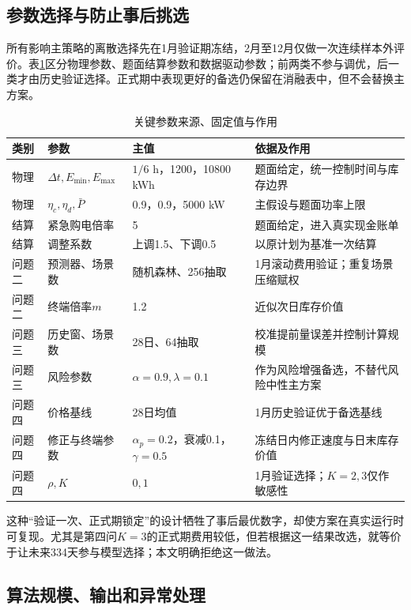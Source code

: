 \subsection{参数选择与防止事后挑选}

所有影响主策略的离散选择先在1月验证期冻结，2月至12月仅做一次连续样本外评价。表\ref{tab:fixed-parameters}区分物理参数、题面结算参数和数据驱动参数；前两类不参与调优，后一类才由历史验证选择。正式期中表现更好的备选仍保留在消融表中，但不会替换主方案。

\begin{table}[H]
\centering
\caption{关键参数来源、固定值与作用}
\label{tab:fixed-parameters}
\begin{tabularx}{\textwidth}{p{2.5cm}p{3.0cm}p{2.5cm}X}
\toprule
类别 & 参数 & 主值 & 依据及作用\\
\midrule
物理 & $\Delta t,E_{\min},E_{\max}$ & $1/6$ h，1200，10800 kWh & 题面给定，统一控制时间与库存边界\\
物理 & $\eta_c,\eta_d,\bar P$ & 0.9，0.9，5000 kW & 主假设与题面功率上限\\
结算 & 紧急购电倍率 & 5 & 题面给定，进入真实现金账单\\
结算 & 调整系数 & 上调1.5、下调0.5 & 以原计划为基准一次结算\\
问题二 & 预测器、场景数 & 随机森林、256抽取 & 1月滚动费用验证；重复场景压缩赋权\\
问题二 & 终端倍率$m$ & 1.2 & 近似次日库存价值\\
问题三 & 历史窗、场景数 & 28日、64抽取 & 校准提前量误差并控制计算规模\\
问题三 & 风险参数 & $\alpha=0.9,\lambda=0.1$ & 作为风险增强备选，不替代风险中性主方案\\
问题四 & 价格基线 & 28日均值 & 1月历史验证优于备选基线\\
问题四 & 修正与终端参数 & $\alpha_p=0.2$，衰减0.1，$\gamma=0.5$ & 冻结日内修正速度与日末库存价值\\
问题四 & $\rho,K$ & $0,1$ & 1月验证选择；$K=2,3$仅作敏感性\\
\bottomrule
\end{tabularx}
\end{table}

这种“验证一次、正式期锁定”的设计牺牲了事后最优数字，却使方案在真实运行时可复现。尤其是第四问$K=3$的正式期费用较低，但若根据这一结果改选，就等价于让未来334天参与模型选择；本文明确拒绝这一做法。

\subsection{算法规模、输出和异常处理}

